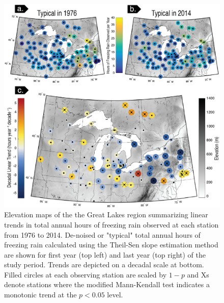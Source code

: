 \documentclass[twocol]{ametsoc}
\begin{document}
\begin{figure}
\centering
\includegraphics[width=1.0\textwidth]{FZRA_Trend_Maps.png}
\caption{\label{fig:trendmap}Elevation maps of the the Great Lakes region summarizing linear trends in total annual hours of freezing rain observed at each station from 1976 to 2014. De-noised or "typical" total annual hours of freezing rain calculated using the Theil-Sen slope estimation method are shown for first year (top left) and last year (top right) of the study period. Trends are depicted on a decadal scale at bottom. Filled circles at each observing station are scaled by $1 - p$ and Xs denote stations where the modified Mann-Kendall test indicates a monotonic trend at the $p<0.05$ level.}
\end{figure}
\end{document}
